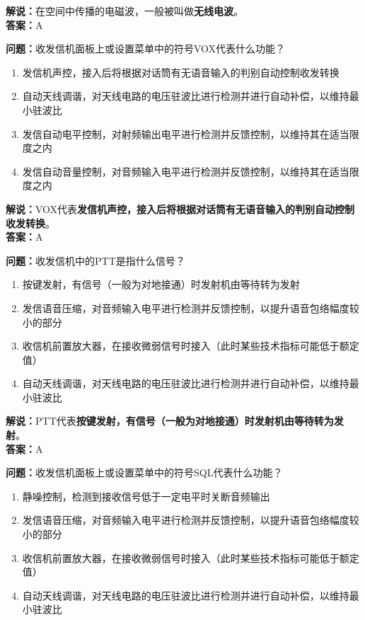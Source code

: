 \textbf{解说：}在空间中传播的电磁波，一般被叫做\textbf{无线电波}。\\\textbf{答案：}A%



\textbf{问题：}收发信机面板上或设置菜单中的符号VOX代表什么功能？

\begin{enumerate}[label=\Alph*), leftmargin=1.5cm]
	\item 发信机声控，接入后将根据对话筒有无语音输入的判别自动控制收发转换
	\item 自动天线调谐，对天线电路的电压驻波比进行检测并进行自动补偿，以维持最小驻波比
	\item 发信自动电平控制，对射频输出电平进行检测并反馈控制，以维持其在适当限度之内
	\item 发信自动音量控制，对音频输入电平进行检测并反馈控制，以维持其在适当限度之内
\end{enumerate}

\textbf{解说：}VOX代表\textbf{发信机声控，接入后将根据对话筒有无语音输入的判别自动控制收发转换}。\\\textbf{答案：}A%



\textbf{问题：}收发信机中的PTT是指什么信号？

\begin{enumerate}[label=\Alph*), leftmargin=1.5cm]
	\item 按键发射，有信号（一般为对地接通）时发射机由等待转为发射
	\item 发信语音压缩，对音频输入电平进行检测并反馈控制，以提升语音包络幅度较小的部分
	\item 收信机前置放大器，在接收微弱信号时接入（此时某些技术指标可能低于额定值）
	\item 自动天线调谐，对天线电路的电压驻波比进行检测并进行自动补偿，以维持最小驻波比
\end{enumerate}

\textbf{解说：}PTT代表\textbf{按键发射，有信号（一般为对地接通）时发射机由等待转为发射}。\\\textbf{答案：}A%



\textbf{问题：}收发信机面板上或设置菜单中的符号SQL代表什么功能？

\begin{enumerate}[label=\Alph*), leftmargin=1.5cm]
	\item 静噪控制，检测到接收信号低于一定电平时关断音频输出
	\item 发信语音压缩，对音频输入电平进行检测并反馈控制，以提升语音包络幅度较小的部分
	\item 收信机前置放大器，在接收微弱信号时接入（此时某些技术指标可能低于额定值）
	\item 自动天线调谐，对天线电路的电压驻波比进行检测并进行自动补偿，以维持最小驻波比
\end{enumerate}

